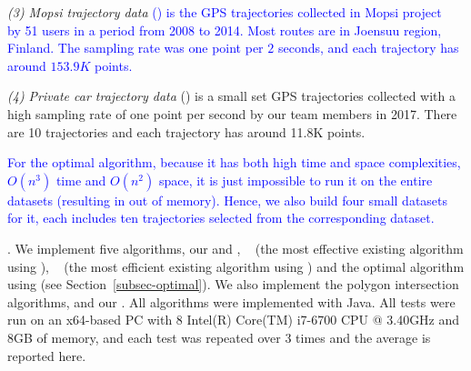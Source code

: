 \vspace{0.5ex}
\ni \emph{(3) Mopsi trajectory data} \textcolor{blue}{(\mopsi) is the GPS trajectories collected in Mopsi project~\cite{Mopsi} by 51 users in a period from 2008 to 2014. Most routes are in Joensuu region, Finland. 
The sampling rate was one point per $2$ seconds, and each trajectory has around $153.9K$ points.}

\vspace{0.5ex}
\ni \emph{(4) Private car trajectory data} (\pricar) is a small set GPS trajectories collected with a high sampling rate of one point per second by our team members in 2017. There are 10 trajectories and each trajectory has around 11.8K points.



\textcolor{blue}{For the optimal algorithm, because it has both high time and space complexities, \ie $O(n^3)$ time and $O(n^2)$ space, it is just impossible to run it on the entire datasets (resulting in out of memory). Hence, we also build four small datasets for it, each includes ten trajectories selected from the corresponding dataset.}


.
We implement five \lsa algorithms, \ie our \cist and \cista, \dps~\cite{Meratnia:Spatiotemporal} (the most effective existing \lsa algorithm using \sed), \squishe~\cite{Muckell:Compression} (the most efficient existing \lsa algorithm using \sed) and the optimal algorithm using \sed (see Section~\ref{subsec-optimal}).
We also implement the polygon intersection algorithms, \cpia and our \rpia.
All algorithms were implemented with Java.
All tests were run on an {x64-based  PC with 8 Intel(R) Core(TM) i7-6700 CPU @ 3.40GHz and 8GB of memory, and each test was repeated
over 3 times and the average is reported here}.

%

